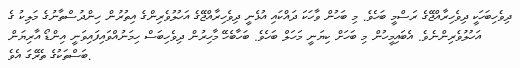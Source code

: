 \documentclass[a4paper]{article}
\begin{document}
\begin{divehi}\small\sloppy
ދިވެހިބަހަކީ ދިވެހިރާއްޖޭގެ ރަސްމީ ބަހެވެ. މި ބަހުން ވާހަކަ ދައްކައި އުޅެނީ ދިވެހިރާއްޖޭގެ އަހުލުވެރިންގެ އިތުރުން ހިންދުސްތާނުގެ މަލިކު ގެ
އަހުލުވެރިންނެވެ. އެބައިމީހުން މި ބަހަށް ކިޔަނީ މަހަލް ބަހެވެ. ބަހާބެހޭ މާހިރުން ދިވެހިބަސް ހިމަނުއްވައިފައިވަނީ އިންޑޯ އާރިޔަން ބަސްތަކުގެ
ތެރޭގަ އެވެ. 
\end{divehi}

%
\end{document}
